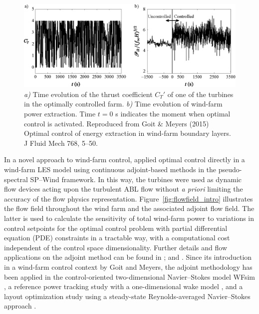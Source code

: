\begin{figure}
	\includegraphics[width=\textwidth]{chapters/introduction/goit_meyers.eps}
	\caption[Time evolution of turbine thrust coefficient and wind-farm power extraction for an optimally controlled farm.]{\emph{a)} Time evolution of the thrust coefficient $C_T'$ of one of the turbines in the optimally controlled farm. \emph{b)} Time evolution of wind-farm power extraction. Time $t = 0$ s indicates the moment when optimal control is activated. \label{fig:goitjfm} Reproduced from Goit \& Meyers (2015) Optimal control of energy extraction in wind-farm boundary layers. J Fluid Mech 768, 5--50. \label{fig:ct_power_goit}}
\end{figure}

In a novel approach to wind-farm control, \cite{goit2015optimal} applied optimal control directly in a wind-farm LES model using continuous adjoint-based methods in the pseudo-spectral SP--Wind framework. In this way, the turbines were used as dynamic flow devices acting upon the turbulent ABL flow without \emph{a priori} limiting the accuracy of the flow physics representation. Figure~\ref{fig:flowfield_intro} illustrates the flow field throughout the wind farm and the associated adjoint flow field. The latter is used to calculate the sensitivity of total wind-farm power to variations in control setpoints for the optimal control problem with partial differential equation (PDE) constraints in a tractable way, with a computational cost independent of the control space dimensionality. Further details and flow applications on the adjoint method can be found in \cite{giles2000introduction,bewley2001dns}; and \cite{troltzsch}. Since its introduction in a wind-farm control context by Goit and Meyers, the adjoint methodology has been applied in the control-oriented two-dimensional Navier--Stokes model WFsim \citep{boersma2016control,vali2016predictive}, a reference power tracking study with a one-dimensional wake model \citep{shapiro2017model}, and a layout optimization study using a steady-state Reynolds-averaged Navier--Stokes approach \citep{king2017optimization}.


